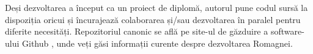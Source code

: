 \documentclass[12pt, a4paper, twoside, romanian]{teza-upb}
\begin{document}
    Deși dezvoltarea a început ca un proiect de diplomă, autorul pune codul sursă la dispoziția oricui și încurajează colaborarea și/sau dezvoltarea în paralel pentru diferite necesități. Repozitoriul canonic se află pe site-ul de găzduire a software-ului Github \cite{Romagna:repo}, unde veți găsi informații curente despre dezvoltarea Romagnei.



\appendix
\end{document}
